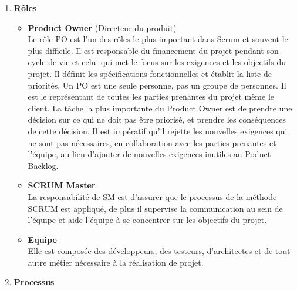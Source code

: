 \begin{enumerate}
	\item \underline{\textbf{Rôles}}
	
	\begin{itemize}
		\item \textbf{Product Owner} (Directeur du produit)\\
		Le rôle PO est l'un des rôles le plus important dans Scrum et souvent le plus difficile. Il est responsable du financement du projet pendant son cycle de vie et celui qui met le focus sur les exigences et les objectifs du projet. Il définit les spécifications fonctionnelles et établit la liste de priorités. Un PO est une seule personne, pas un groupe de personnes. Il est le représentant de toutes les parties prenantes du projet même le client. La tâche la plus importante du Product Owner est de prendre une décision sur ce qui ne doit pas être priorisé, et
		prendre les conséquences de cette décision. Il est impératif qu'il rejette les nouvelles exigences qui ne sont pas nécessaires, en
		collaboration avec les parties prenantes et l'équipe, au lieu d'ajouter de nouvelles exigences inutiles au Poduct Backlog.
		\item \textbf{SCRUM Master}\\
		La responsabilité de SM est d'assurer que le processus de la méthode SCRUM est appliqué, de plus il supervise la communication au sein de l'équipe et aide l'équipe à se concentrer sur les objectifs du projet.
		\item \textbf{Equipe}\\
		Elle est composée des développeurs, des testeurs, d'architectes et de tout 	autre métier nécessaire à la réalisation de projet.
	\end{itemize}
	\item \underline{\textbf{Processus}}
	

\end{enumerate}
